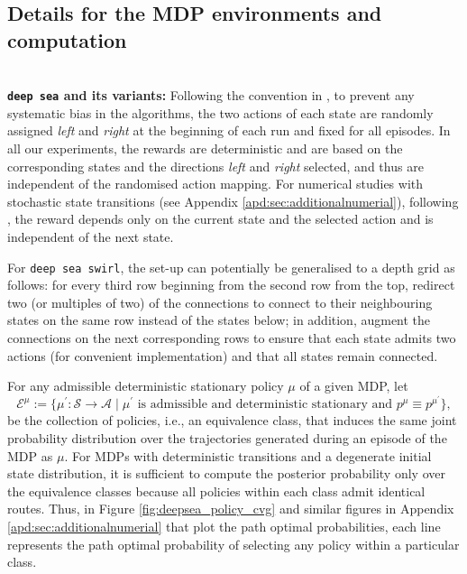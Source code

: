 \documentclass{amsart}
\begin{document}
\subsection{Details for the MDP environments and computation}\,\\

\textbf{\texttt{deep sea} and its variants:} Following the convention in \citet{bsuite, bootstraposband}, to prevent any systematic bias in the algorithms, the two actions of each state are randomly assigned \textit{left} and \textit{right} at the beginning of each run and fixed for all episodes. In all our experiments, the rewards are deterministic and are based on the corresponding states and the directions \textit{left} and \textit{right} selected, and thus are independent of the randomised action mapping. For numerical studies with stochastic state transitions (see Appendix \ref{apd:sec:additionalnumerial}), following \citet{bsuite}, the reward depends only on the current state and the selected action and is independent of the next state. 

For \texttt{deep sea swirl}, the set-up can potentially be generalised to a depth grid as follows: for every third row beginning from the second row from the top, redirect two (or multiples of two) of the connections to connect to their neighbouring states on the same row instead of the states below; in addition, augment the connections on the next corresponding rows to ensure that each state admits two actions (for convenient implementation) and that all states remain connected.

For any admissible deterministic stationary policy $\mu$ of a given MDP, let
$$\mathcal{E}^\mu:= \{\mu^\prime :\mathcal{S} \rightarrow \mathcal{A} \mid \mu^\prime \text{ is admissible and deterministic stationary and } p^\mu \equiv p^{\mu^\prime}\},$$ be the collection of policies, i.e., an equivalence class, that induces the same joint probability distribution over the trajectories generated during an episode of the MDP as $\mu$. For MDPs with deterministic transitions and a degenerate initial state distribution, it is sufficient to compute the posterior probability only over the equivalence classes because all policies within each class admit identical routes. Thus, in Figure \ref{fig:deepsea_policy_cvg} and similar figures in Appendix \ref{apd:sec:additionalnumerial} that plot the path optimal probabilities, each line represents the path optimal probability of selecting any policy within a particular class.
\end{document}
